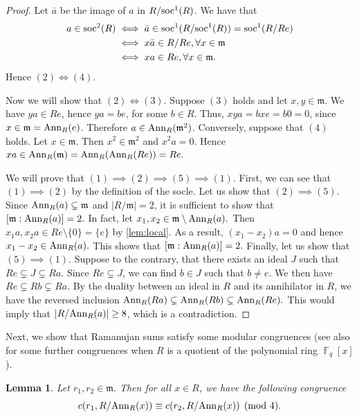 \documentclass[12pt, a4paper]{amsart}
\newtheorem{lem}[thm]{Lemma}
\theoremstyle{definition}
\DeclareMathOperator{\F}{\mathbb{F}}
\newcommand{\Ann}{{\rm Ann}}
\numberwithin{equation}{section}
\newcommand{\soc}{{{\rm soc}}}
\begin{document}
\begin{proof}

Let $\bar{a}$ be  the image of $a$ in $R/\soc^1(R)$. We have that
\[
\begin{aligned}
a\in \soc^2(R) &\iff \bar{a} \in \soc^1(R/\soc^1(R))=\soc^1(R/Re) \\
&\iff x\bar{a}\in R/Re, \forall x\in \mathfrak{m}\\
&\iff xa \in Re, \forall x\in \mathfrak{m}.
\end{aligned}
\]
Hence $(2)\iff (4)$. 

Now we will show that $(2) \iff (3)$. Suppose $(3)$ holds and let $x,y\in \mathfrak{m}$. We have $ya\in Re$, hence $ya=be$, for some $b\in R$. Thus, $xya=bxe=b0=0$, since $x\in \mathfrak{m}=\Ann_R(e)$. Therefore $a\in \Ann_R(\mathfrak{m}^2)$. Conversely, suppose that $(4)$ holds. Let $x\in \mathfrak{m}$. Then $x^2\in \mathfrak{m}^2$ and $x^2a=0$. Hence $xa\in \Ann_R(\mathfrak{m})=\Ann_R(\Ann_R(Re))=Re.$

We will prove that $(1) \implies (2)  \implies (5) \implies (1).$ First, we can see that $(1) \implies (2)$ by the definition of the socle. Let us show that $(2) \implies (5).$ Since $\Ann_{R}(a) \subsetneq \mathfrak{m}$ and $|R/\mathfrak{m}|=2$, it is sufficient to show that $[\mathfrak{m}:\Ann_{R}(a)] =2.$ In fact, let $x_1, x_2 \in \mathfrak{m} \setminus \Ann_{R}(a).$ Then $x_1 a, x_2 a \in Re \setminus \{0\}=\{e\}$ by \cref{lem:local}. As a result, $(x_1-x_2)a =0$ and hence $x_1-x_2 \in \Ann_{R}(a).$ This shows that $[\mathfrak{m}:\Ann_{R}(a)] =2.$ Finally, let us show that $(5) \implies (1).$ Suppose to the contrary, that there exists an ideal $J$ such that $Re \subsetneq J \subsetneq Ra.$ Since $Re \subsetneq J$, we can find $b \in J$ such that $b \neq e.$ We then have $Re \subsetneq Rb \subsetneq Ra.$ By the duality between an ideal in $R$ and its annihilator in $R$, we have the reversed inclusion $\Ann_{R}(Ra) \subsetneq \Ann_{R}(Rb) \subsetneq \Ann_{R}(Re).$ This would imply that $|R/\Ann_{R}(a)| \geq 8$, which is a contradiction. 
\end{proof}
Next, we show that Ramanujan sums satisfy some modular congruences (see also \cite[Proposition 3.12]{minavc2023arithmetic} for some further congruences when $R$ is a quotient of the polynomial ring $\F_q[x]$). 
\begin{lem} \label{lem:congruence}
Let $r_1, r_2 \in \mathfrak{m}.$ Then for all $x \in R$, we have the following congruence 
\[ c(r_1, R/\Ann_{R}(x)) \equiv c(r_2, R/\Ann_{R}(x)) \pmod{4}. \] 
\end{lem}
\end{document}
